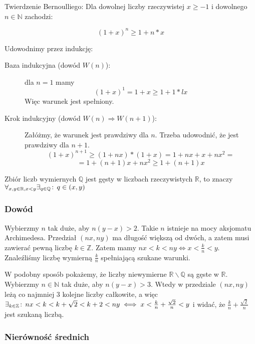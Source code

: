 \documentclass[9pt]{article}
\begin{document}
Twierdzenie Bernoulliego: Dla dowolnej liczby rzeczywistej $x \ge -1$ i dowolnego $n \in \mathbb{N}$
zachodzi:

\[
    (1+x)^n \ge 1+n*x
\]

Udowodnimy przez indukcję:
\begin{description}
    \item[Baza indukcyjna (dowód $W(n)$):] dla $n=1$ mamy 
        \[
            (1+x)^1 = 1+x \ge 1+1*lx
        \]
        Więc warunek jest spełniony.
    \item[Krok indukcyjny (dowód $W(n) \Rightarrow W(n+1)$):]
        Załóżmy, że warunek jest prawdziwy dla $n$. Trzeba udowodnić, że jest prawdziwy dla $n+1$.
        \[
            (1+x)^{n+1} \ge (1+nx)*(1+x) = 1+nx + x + nx^2 =
        \]
        \[
            = 1+(n+1)x + nx^2 \ge 1+(n+1)x
        \]
\end{description}

\begin{Twi}
    Zbiór liczb wymiernych $\mathbb{Q}$ jest gęsty w liczbach rzeczywistych $\mathbb{R}$, to znaczy 
    $\forall_{x, y \in \mathbb{R}, x < y}\exists_{q \in \mathbb{Q}} \! : \, q \in (x,y)$
\end{Twi}

\subsubsection*{Dowód}

Wybierzmy $n$ tak duże, aby $n(y-x) > 2$. Takie $n$ istnieje na mocy aksjomatu Archimedesa.
Przedział $(nx, ny)$ ma długość większą od dwóch, a zatem musi zawierać pewną liczbę $k \in
\mathbb{Z}$. Zatem mamy $nx < k < ny \iff x < \frac{k}{n} < y$. Znaleźliśmy liczbę wymierną
$\frac{k}{n}$ spełniającą szukane warunki.

\bigbreak

W podobny sposób pokażemy, że liczby niewymierne $\mathbb{R}\backslash\mathbb{Q}$ są gęste w
$\mathbb{R}$. Wybierzmy $n \in \mathbb{N}$ tak duże, aby $n(y-x) > 3$. Wtedy w przedziale $(nx, ny)$
leżą co najmniej $3$ kolejne liczby całkowite, a więc $\exists_{k \in \mathbb{Z}} \! : \, nx < k <
k+\sqrt{2} < k + 2 < ny \iff x < \frac{k}{n} + \frac{\sqrt{2}}{n} < y$ i widać, że $\frac{k}{n} +
\frac{\sqrt{2}}{n}$ jest szukaną liczbą.

\subsubsection*{Nierówność średnich}
\end{document}
